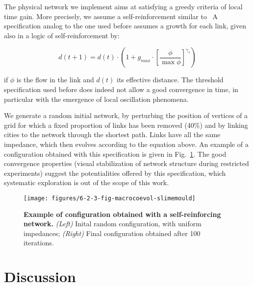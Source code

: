 The physical network we implement aims at satisfying a greedy criteria of local time gain. More precisely, we assume a self-reinforcement similar to~\cite{tero2010rules} A specification analog to the one used before assumes a growth for each link, given also in a logic of self-reinforcement by:

\[
d(t+1) = d(t)\cdot \left(1 + g_{max} \cdot \left[\frac{\phi}{\max \phi}\right]^{\gamma_s}\right)
\]

if $\phi$ is the flow in the link and $d(t)$ its effective distance. The threshold specification used before does indeed not allow a good convergence in time, in particular with the emergence of local oscillation phenomena.

We generate a random initial network, by perturbing the position of vertices of a grid for which a fixed proportion of links has been removed (40\%) and by linking cities to the network through the shortest path. Links have all the same impedance, which then evolves according to the equation above. An example of a configuration obtained with this specification is given in Fig.~\ref{fig:macrocoevolution:slimemould}. The good convergence properties (visual stabilization of network structure during restricted experiments) suggest the potentialities offered by this specification, which systematic exploration is out of the scope of this work.


\begin{figure}
	\texttt{[image: figures/6-2-3-fig-macrocoevol-slimemould]}
	\caption[Example of application of the macroscopic model with a self-reinforcing network]{\textbf{Example of configuration obtained with a self-reinforcing network.} \textit{(Left)} Inital random configuration, with uniform impedances; \textit{(Right)} Final configuration obtained after 100 iterations. \label{fig:macrocoevolution:slimemould}}
\end{figure}




\section{Discussion}



